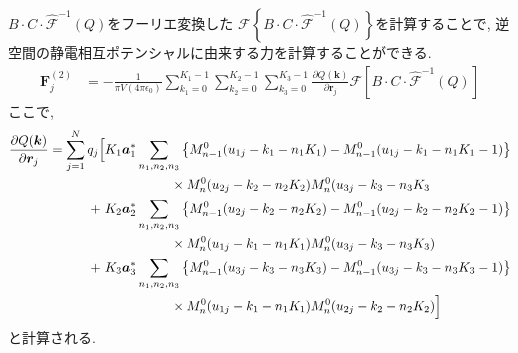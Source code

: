 $B \cdot C \cdot \hat{\mathcal{F}}^{-1}(Q)$をフーリエ変換した
$\mathcal{F} \left\{B \cdot C \cdot \hat{\mathcal{F}}^{-1}(Q)\right\}$を計算することで,
逆空間の静電相互ポテンシャルに由来する力を計算することができる.
\begin{align}
    \bm{F}_{j}^{(2)}
 &=
   -\frac{1}{\pi V (4 \pi \epsilon_{0})}
    \sum_{k_{1}=0}^{K_{1}-1}
    \sum_{k_{2}=0}^{K_{2}-1}
    \sum_{k_{3}=0}^{K_{3}-1}
    \frac{\partial Q (\bm{k})}{\partial \bm{r}_{j}}
    \mathcal{F} \left[ B \cdot C \cdot \hat{\mathcal{F}}^{-1}(Q) \right]
\end{align}
ここで,
\begin{align}
  \frac{\partial Q(\bm{k})}{\partial \bm{r}_{j}}
 =
    \sum_{j=1}^{N} q_{j}
    \Bigl[
           &K_{1} \bm{a}_{1}^{*}
            \sum_{n_{1},n_{2},n_{3}}
            \left\{
              M_{n-1}^{0}(u_{1j} - k_{1} - n_{1}K_{1}) - M_{n-1}^{0}(u_{1j} - k_{1} - n_{1}K_{1} - 1)
            \right\}
            \notag \\
            &~~~~~~~~~~~~~~~\times
            M_{n}^{0}(u_{2j} - k_{2} - n_{2}K_{2}) M_{n}^{0}(u_{3j} - k_{3} - n_{3}K_{3}
    \notag \\
          +~&K_{2} \bm{a}_{2}^{*}
            \sum_{n_{1},n_{2},n_{3}}
            \left\{
              M_{n-1}^{0}(u_{2j} - k_{2} - n_{2}K_{2}) - M_{n-1}^{0}(u_{2j} - k_{2} - n_{2}K_{2} - 1)
            \right\}
            \notag \\
            &~~~~~~~~~~~~~~~\times
            M_{n}^{0}(u_{1j} - k_{1} - n_{1}K_{1}) M_{n}^{0}(u_{3j} - k_{3} - n_{3}K_{3})
    \notag \\
          +~&K_{3} \bm{a}_{3}^{*}
            \sum_{n_{1},n_{2},n_{3}}
            \left\{
              M_{n-1}^{0}(u_{3j} - k_{3} - n_{3}K_{3}) - M_{n-1}^{0}(u_{3j} - k_{3} - n_{3}K_{3} - 1)
            \right\}
            \notag \\
            &~~~~~~~~~~~~~~~\times
            M_{n}^{0}(u_{1j} - k_{1} - n_{1}K_{1}) M_{n}^{0}(u_{2j} - k_{2} - n_{2}K_{2})
    \Bigr]
\end{align}
と計算される.
\\

